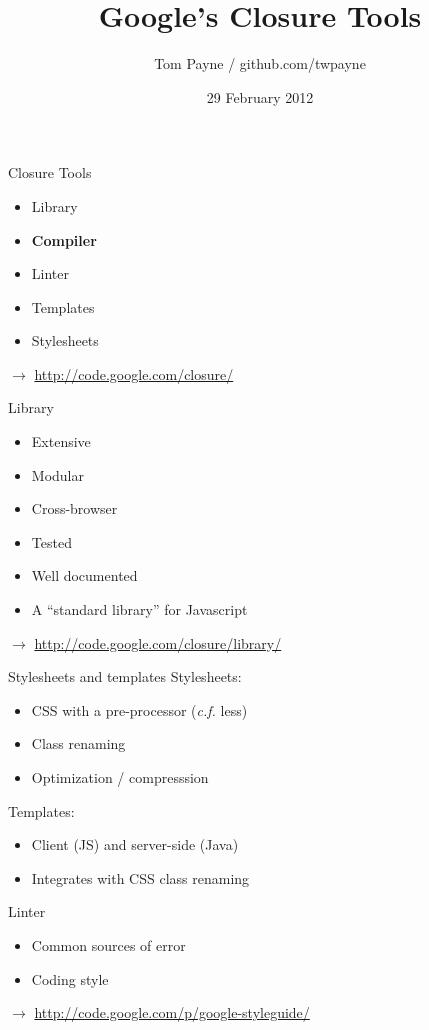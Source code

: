 \documentclass{powerdot}
\title{Google's Closure Tools}
\author{Tom Payne / github.com/twpayne}
\date{29 February 2012}
\begin{document}
\newcommand{\code}[1]{{\small\texttt{#1}}}
\newcommand{\link}[1]{{\small$\rightarrow$ \href{#1}{#1}}}

\maketitle

\begin{slide}{Closure Tools}
\begin{itemize}
\item Library
\item \textbf{Compiler}
\item Linter
\item Templates
\item Stylesheets
\end{itemize}
\link{http://code.google.com/closure/}
\end{slide}

\begin{slide}{Library}
\begin{itemize}
\item Extensive
\item Modular
\item Cross-browser
\item Tested
\item Well documented
\item A ``standard library'' for Javascript
\end{itemize}
\link{http://code.google.com/closure/library/}
\end{slide}

\begin{slide}{Stylesheets and templates}
Stylesheets:
\begin{itemize}
\item CSS with a pre-processor (\textit{c.f.} less)
\item Class renaming
\item Optimization / compresssion
\end{itemize}
Templates:
\begin{itemize}
\item Client (JS) and server-side (Java)
\item Integrates with CSS class renaming
\end{itemize}
\end{slide}

\begin{slide}{Linter}
\begin{itemize}
\item Common sources of error
\item Coding style
\end{itemize}
\link{http://code.google.com/p/google-styleguide/}
\end{slide}
\end{document}
